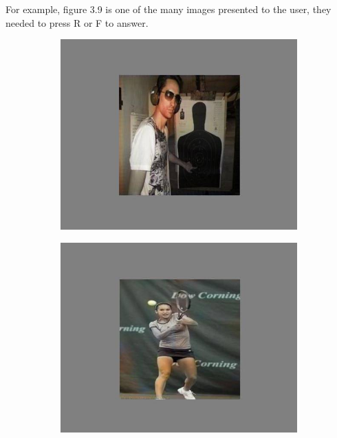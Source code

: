 For example, figure 3.9 is one of the many images presented to the user, they needed to press R or F to answer.

\begin{figure}[H]
     \centering
     \begin{subfigure}[b]{0.3\textwidth}
         \centering
         \includegraphics[width=\textwidth]{sections/figures/study_1.JPG}
         \caption{}
         \label{fig:y equals x}
     \end{subfigure}
     \hfill
     \begin{subfigure}[b]{0.3\textwidth}
         \centering
         \includegraphics[width=\textwidth]{sections/figures/study_2.JPG}

\end{subfigure}
\end{figure}
